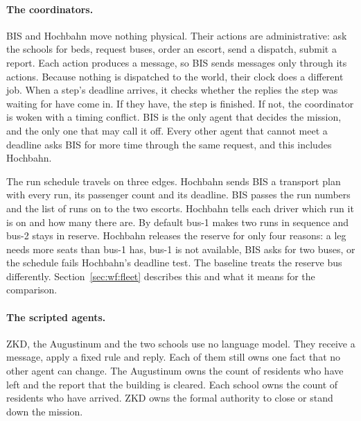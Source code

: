\paragraph{The coordinators.} BIS and Hochbahn move nothing physical. Their
actions are administrative: ask the schools for beds, request buses, order an
escort, send a dispatch, submit a report. Each action produces a message, so BIS sends messages only
through its actions. Because nothing is dispatched to the world, their clock
does a different job. When a step's deadline arrives, it checks whether the
replies the step was waiting for have come in. If they have, the step is
finished. If not, the coordinator is woken with a timing conflict. BIS is the
only agent that decides the mission, and the only one that may call it off.
Every other agent that cannot meet a deadline asks BIS for more
time through the same request, and this includes Hochbahn.

The run schedule travels on three edges. Hochbahn sends BIS a
transport plan with every run, its passenger count and its deadline. BIS passes
the run numbers and the list of runs on to the two escorts. Hochbahn tells each
driver which run it is on and how many there are. By default bus-1 makes two
runs in sequence and bus-2 stays in reserve. Hochbahn releases the reserve for
only four reasons: a leg needs more seats than bus-1 has, bus-1 is not
available, BIS asks for two buses, or the schedule fails Hochbahn's deadline
test. The
baseline treats the reserve bus differently. Section~\ref{sec:wf:fleet}
describes this and what it means for the comparison.

\paragraph{The scripted agents.} ZKD, the Augustinum and the two schools use
no language model. They receive a message, apply
a fixed rule and reply. Each of them still owns one fact that no other agent can
change. The Augustinum owns the count of residents who have left and the report
that the building is cleared. Each school owns the count of residents who have
arrived. ZKD owns the formal authority to close or stand down the mission.

